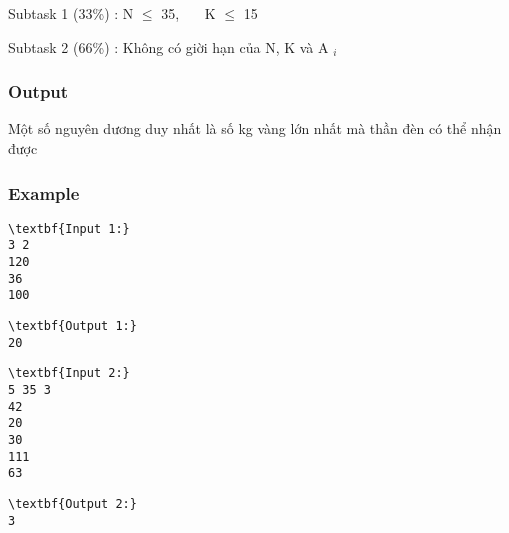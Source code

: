 Subtask 1 (33\%) : N  $\le$  35,    K  $\le$  15

Subtask 2 (66\%) : Không có giời hạn của N, K và A $_ i $

\subsubsection{Output}

Một số nguyên dương duy nhất là số kg vàng lớn nhất mà thần đèn có thể nhận được

\subsubsection{Example}
\begin{verbatim}
\textbf{Input 1:}
3 2
120
36
100\end{verbatim}
\begin{verbatim}
\textbf{Output 1:}
20\end{verbatim}
\begin{verbatim}
\textbf{Input 2:}
5 35 3
42
20
30
111
63\end{verbatim}
\begin{verbatim}
\textbf{Output 2:}
3
\end{verbatim}
